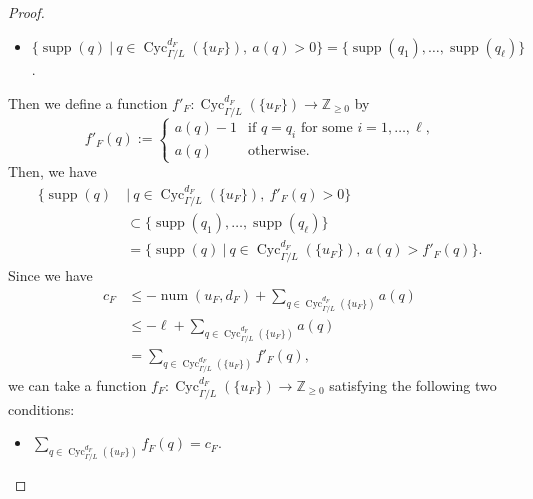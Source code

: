 \documentclass[11pt]{article}
\theoremstyle{definition}
\numberwithin{equation}{section}
\begin{document}
\begin{proof}
\begin{itemize}
\item 
$\bigl\{ \operatorname{supp}(q) \ \big| \  q \in \operatorname{Cyc}_{\Gamma /L}^{d_F} (\{ u_F \}),\ a(q)>0 \bigr \}
= \{ \operatorname{supp}(q_1), \ldots ,  \operatorname{supp}(q_{\ell}) \}$. 
\end{itemize} 
Then we define a function $f' _F: \operatorname{Cyc}_{\Gamma /L}^{d_F} (\{ u_F \}) \to \mathbb{Z}_{\ge 0} $ by 
\[
f'_F (q) := 
\begin{cases}
a(q)-1 & \text{if $q = q_i$ for some $i = 1, \ldots , \ell$,}\\
a(q) & \text{otherwise.}
\end{cases}
\]
Then, we have 
\begin{align*}\tag{i}
\bigl\{ \operatorname{supp}(q) \  & \big| \  q \in \operatorname{Cyc}_{\Gamma /L}^{d_F} (\{ u_F \}),\ f'_F(q)>0 \bigr \} \\
&\subset \{ \operatorname{supp}(q_1), \ldots ,  \operatorname{supp}(q_{\ell})  \} \\
&= \bigl\{ \operatorname{supp}(q) \ \big| \  q \in \operatorname{Cyc}_{\Gamma /L}^{d_F} (\{ u_F \}),\ a(q)>f'_F(q) \bigr \}. 
\end{align*}
Since we have
\begin{align*}
c_F 
& \le 
- \operatorname{num}(u_F, d_F) + \sum _{q \in \operatorname{Cyc}_{\Gamma /L}^{d_F} (\{ u_F \})} a(q) \\
& \le 
- \ell + \sum _{q \in \operatorname{Cyc}_{\Gamma /L}^{d_F} (\{ u_F \})} a(q) \\
& =
\sum _{q \in \operatorname{Cyc}_{\Gamma /L}^{d_F} (\{ u_F \})} f' _F(q), 
\end{align*}
we can take a function $f_F : \operatorname{Cyc}_{\Gamma /L}^{d_F} (\{ u_F \}) \to \mathbb{Z}_{\ge 0}$ satisfying the following two conditions:
\begin{itemize}
\item[(ii)] 
$\sum _{q \in \operatorname{Cyc}_{\Gamma /L}^{d_F} (\{ u_F \})} f_F(q) = c_F$. 


\end{itemize}
\end{proof}
\end{document}

